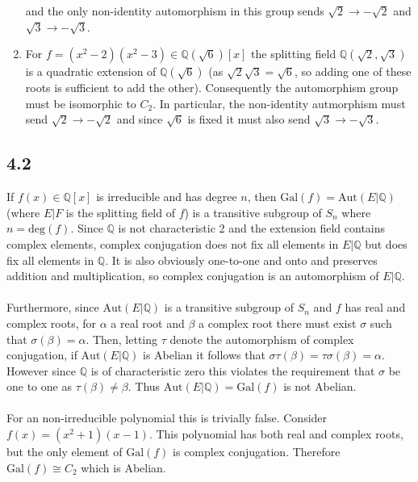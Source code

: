 \documentclass{article}
\begin{document}
\begin{enumerate}
    and the only non-identity automorphism in this group sends $\sqrt{2} \rightarrow - \sqrt{2}$ 
    and $\sqrt{3} \rightarrow -\sqrt{3}$.
    \item For $f = (x^2-2)(x^2-3) \in \mathbb{Q}(\sqrt{6})[x]$ the splitting field $\mathbb{Q}(\sqrt{2},\sqrt{3})$ is a
    quadratic extension of $\mathbb{Q}(\sqrt{6})$ (as $\sqrt{2}\sqrt{3} = \sqrt{6}$, so adding one of these 
    roots is sufficient to add the other). Consequently the automorphism group must be isomorphic 
    to $C_2$. In particular, the non-identity autmorphism must send $\sqrt{2} \rightarrow -\sqrt{2}$ 
    and since $\sqrt{6}$ is fixed it must also send $\sqrt{3} \rightarrow -\sqrt{3}$.
\end{enumerate}

\subsection*{4.2}
If $f(x) \in \mathbb{Q}[x]$ is irreducible and has degree $n$, then $\text{Gal}(f) = \text{Aut}(E|\mathbb{Q})$ (where $E|F$ is the splitting field of $f$) is a transitive 
subgroup of $S_n$ where $n = \text{deg}(f)$. Since $\mathbb{Q}$ is not characteristic 2 and the 
extension field contains complex elements, complex conjugation does not fix all elements in $E|\mathbb{Q}$ 
but does fix all elements in $\mathbb{Q}$. It is also obviously one-to-one and onto and preserves 
addition and multiplication, so complex conjugation is an automorphism of $E|\mathbb{Q}$.

\paragraph{}
Furthermore, since $\text{Aut}(E|\mathbb{Q})$ is a transitive subgroup of $S_n$ and $f$ has 
real and complex roots, for $\alpha$ a real root and $\beta$ a complex root there must exist 
$\sigma$ such that $\sigma(\beta) = \alpha$. Then, letting $\tau$ denote the automorphism of 
complex conjugation, if $\text{Aut}(E|\mathbb{Q})$ is Abelian it follows that $\sigma\tau(\beta) = \tau\sigma(\beta) = \alpha$. 
However since $\mathbb{Q}$ is of characteristic zero this violates the requirement that $\sigma$ be 
one to one as $\tau(\beta) \neq \beta$. Thus $\text{Aut}(E|\mathbb{Q}) = \text{Gal}(f)$ is not Abelian.

\paragraph{}
For an non-irreducible polynomial this is trivially false. Consider $f(x) = (x^2+1)(x-1)$. This 
polynomial has both real and complex roots, but the only element of $\text{Gal}(f)$ is 
complex conjugation. Therefore $\text{Gal}(f) \cong C_2$ which is Abelian.
\end{document}
